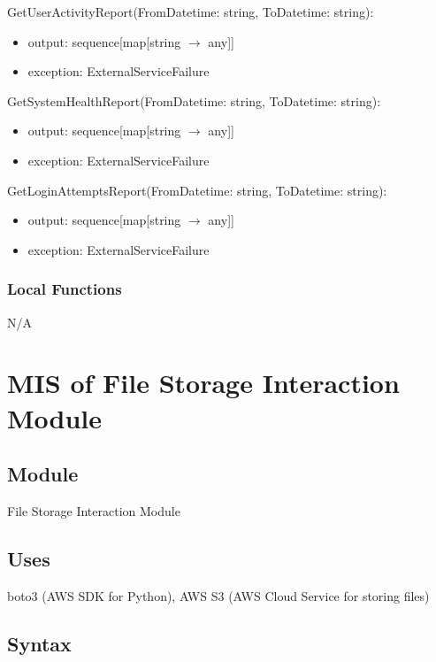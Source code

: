 \documentclass[12pt, titlepage]{article}
\begin{document}
{  \noindent GetUserActivityReport(FromDatetime: string, ToDatetime: string):
  \begin{itemize}
    \item output: sequence[map[string $\rightarrow$ any]]
    \item exception: ExternalServiceFailure
  \end{itemize}

  \noindent GetSystemHealthReport(FromDatetime: string, ToDatetime: string):
  \begin{itemize}
    \item output: sequence[map[string $\rightarrow$ any]]
    \item exception: ExternalServiceFailure
  \end{itemize}

  \noindent GetLoginAttemptsReport(FromDatetime: string, ToDatetime: string):
  \begin{itemize}
    \item output: sequence[map[string $\rightarrow$ any]]
    \item exception: ExternalServiceFailure
  \end{itemize}

  \subsubsection{Local Functions}

  N/A

  \section{MIS of File Storage Interaction Module}
  \label{sec:FS}

  \subsection{Module}

  File Storage Interaction Module

  \subsection{Uses}

  boto3 (AWS SDK for Python), AWS S3 (AWS Cloud Service for storing files)

  \subsection{Syntax}

}
\end{document}
